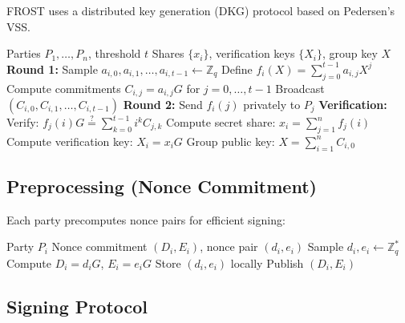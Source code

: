 \documentclass[11pt,a4paper]{article}
\theoremstyle{definition}
\begin{document}
FROST uses a distributed key generation (DKG) protocol based on Pedersen's VSS.

\begin{algorithm}
\caption{FROST Distributed Key Generation}
\begin{algorithmic}[1]
\Require Parties $P_1, \ldots, P_n$, threshold $t$
\Ensure Shares $\{x_i\}$, verification keys $\{X_i\}$, group key $X$
\State \textbf{Round 1:}
    \State Sample $a_{i,0}, a_{i,1}, \ldots, a_{i,t-1} \leftarrow \mathbb{Z}_q$
    \State Define $f_i(X) = \sum_{j=0}^{t-1} a_{i,j} X^j$
    \State Compute commitments $C_{i,j} = a_{i,j} G$ for $j = 0, \ldots, t-1$
    \State Broadcast $(C_{i,0}, C_{i,1}, \ldots, C_{i,t-1})$
\EndFor
\State \textbf{Round 2:}
        \State Send $f_i(j)$ privately to $P_j$
    \EndFor
\EndFor
\State \textbf{Verification:}
        \State Verify: $f_j(i) G \stackrel{?}{=} \sum_{k=0}^{t-1} i^k C_{j,k}$
    \EndFor
    \State Compute secret share: $x_i = \sum_{j=1}^{n} f_j(i)$
    \State Compute verification key: $X_i = x_i G$
\EndFor
\State Group public key: $X = \sum_{i=1}^{n} C_{i,0}$
\end{algorithmic}
\end{algorithm}

\subsection{Preprocessing (Nonce Commitment)}

Each party precomputes nonce pairs for efficient signing:

\begin{algorithm}
\caption{FROST Nonce Generation}
\begin{algorithmic}[1]
\Require Party $P_i$
\Ensure Nonce commitment $(D_i, E_i)$, nonce pair $(d_i, e_i)$
\State Sample $d_i, e_i \leftarrow \mathbb{Z}_q^*$
\State Compute $D_i = d_i G$, $E_i = e_i G$
\State Store $(d_i, e_i)$ locally
\State Publish $(D_i, E_i)$
\end{algorithmic}
\end{algorithm}

\subsection{Signing Protocol}
\end{document}
